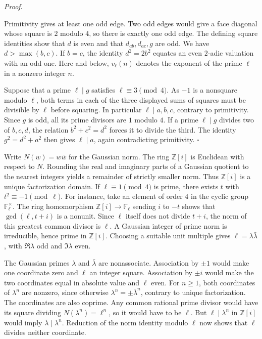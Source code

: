 \documentclass[11pt,a4paper,twoside]{article}
\numberwithin{equation}{section}
\newcommand{\proseheadingstop}{.}
\providecommand{\proofname}{Proof}
\newenvironment{proof}[1][\proofname]{%
  \par\addvspace{.65\baselineskip}\noindent
  \textit{#1}\proseheadingstop\enspace\ignorespaces
}{%
  \unskip\nobreak\hfill\nobreak\(\square\)\par
  \addvspace{.65\baselineskip}
}
\begin{document}
\begin{proof}
Primitivity gives at least one odd edge. Two odd edges would give a face diagonal whose square is \(2\) modulo \(4\), so there is exactly one odd edge. The defining square identities show that \(d\) is even and that \(d_{ab},d_{ac},g\) are odd. We have \(d>\max(b,c)\). If \(b=c\), the identity \(d^2=2b^2\) equates an even \(2\)-adic valuation with an odd one. Here and below, \(v_\ell(n)\) denotes the exponent of the prime \(\ell\) in a nonzero integer \(n\).

Suppose that a prime \(\ell\mid g\) satisfies \(\ell\equiv3\pmod 4\). As \(-1\) is a nonsquare modulo \(\ell\), both terms in each of the three displayed sums of squares must be divisible by \(\ell\) before squaring. In particular \(\ell\mid a,b,c\), contrary to primitivity. Since \(g\) is odd, all its prime divisors are \(1\) modulo \(4\). If a prime \(\ell\mid g\) divides two of \(b,c,d\), the relation \(b^2+c^2=d^2\) forces it to divide the third. The identity \(g^2=d^2+a^2\) then gives \(\ell\mid a\), again contradicting primitivity.
\end{proof}

Write \(N(w)=w\bar w\) for the Gaussian norm. The ring \(\mathbb Z[i]\) is Euclidean with respect to \(N\). Rounding the real and imaginary parts of a Gaussian quotient to the nearest integers yields a remainder of strictly smaller norm. Thus \(\mathbb Z[i]\) is a unique factorization domain. If \(\ell\equiv1\pmod 4\) is prime, there exists \(t\) with \(t^2\equiv-1\pmod\ell\). For instance, take an element of order \(4\) in the cyclic group \(\mathbb F_\ell^\times\). The ring homomorphism \(\mathbb Z[i]\to\mathbb F_\ell\) sending \(i\) to \(-t\) shows that \(\gcd(\ell,t+i)\) is a nonunit. Since \(\ell\) itself does not divide \(t+i\), the norm of this greatest common divisor is \(\ell\). A Gaussian integer of prime norm is irreducible, hence prime in \(\mathbb Z[i]\). Choosing a suitable unit multiple gives \(\ell=\lambda\bar\lambda\), with \(\Re\lambda\) odd and \(\Im\lambda\) even.

The Gaussian primes \(\lambda\) and \(\bar\lambda\) are nonassociate. Association by \(\pm1\) would make one coordinate zero and \(\ell\) an integer square. Association by \(\pm i\) would make the two coordinates equal in absolute value and \(\ell\) even. For \(n\ge1\), both coordinates of \(\lambda^n\) are nonzero, since otherwise \(\lambda^n=\pm\bar\lambda^n\), contrary to unique factorization. The coordinates are also coprime. Any common rational prime divisor would have its square dividing \(N(\lambda^n)=\ell^n\), so it would have to be \(\ell\). But \(\ell\mid\lambda^n\) in \(\mathbb Z[i]\) would imply \(\bar\lambda\mid\lambda^n\). Reduction of the norm identity modulo \(\ell\) now shows that \(\ell\) divides neither coordinate.
\end{document}
